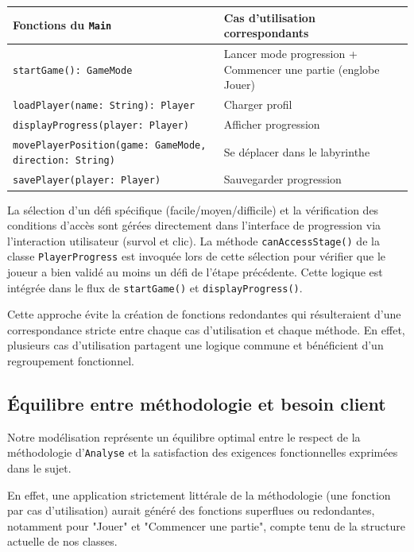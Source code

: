 \documentclass{butexFR}
\begin{document}
\vspace{1em}
\begin{center}
\begin{tabular}{|p{6cm}|p{7cm}|}
\hline
\textbf{Fonctions du \texttt{Main}} & \textbf{Cas d'utilisation correspondants} \\
\hline
\texttt{startGame(): GameMode} & Lancer mode progression + Commencer une partie (englobe Jouer)\\
\hline
\texttt{loadPlayer(name: String): Player} & Charger profil \\
\hline
\texttt{displayProgress(player: Player)} & Afficher progression \\
\hline
\texttt{movePlayerPosition(game: GameMode, direction: String)} & Se déplacer dans le labyrinthe \\
\hline
\texttt{savePlayer(player: Player)}  & Sauvegarder progression \\
\hline
\end{tabular}
\end{center}
\vspace{1em}


La sélection d'un défi spécifique (facile/moyen/difficile) et la vérification des conditions d'accès sont gérées directement dans l'interface de progression via l'interaction utilisateur (survol et clic). La méthode \texttt{canAccessStage()} de la classe \texttt{PlayerProgress} est invoquée lors de cette sélection pour vérifier que le joueur a bien validé au moins un défi de l'étape précédente. Cette logique est intégrée dans le flux de \texttt{startGame()} et \texttt{displayProgress()}.

Cette approche évite la création de fonctions redondantes qui résulteraient d'une correspondance stricte entre chaque cas d'utilisation et chaque méthode. En effet, plusieurs cas d'utilisation partagent une logique commune et bénéficient d'un regroupement fonctionnel.

\subsection{Équilibre entre méthodologie et besoin client}

Notre modélisation représente un équilibre optimal entre le respect de la méthodologie d'\texttt{Analyse} et la satisfaction des exigences fonctionnelles exprimées dans le sujet.

En effet, une application strictement littérale de la méthodologie (une fonction par cas d'utilisation) aurait généré des fonctions superflues ou redondantes, notamment pour "Jouer" et "Commencer une partie", compte tenu de la structure actuelle de nos classes.
\end{document}

